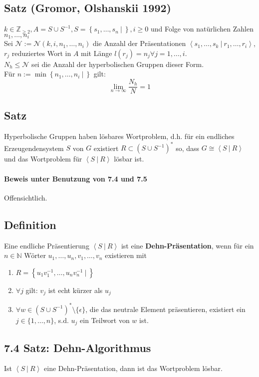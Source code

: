 \documentclass{article}
\newcommand{\df}[1]{\textbf{#1}\index{#1}}
\newcommand{\N}{\mathbb{N}}
\newcommand{\Z}{\mathbb{Z}}
\newcommand{\set}[2]{\left\lbrace #1~|~#2 \right\rbrace}
\newcommand{\grp}[2]{\left\langle #1~|~#2 \right\rangle}
\begin{document}
\subsection{Satz (Gromor, Olshanskii 1992)}
$k \in \Z_{\geq 2}, A = S\cup S^{-1}, S = \set{s_1,\ldots,s_n}{}, i \geq 0$ und Folge von natürlichen Zahlen $n_1,\ldots,n_i$\\
Sei $\mathcal{N} := \mathcal{N}(k,i,n_1,\ldots, n_i)$ die Anzahl der Präsentationen $\grp{s_1,\ldots, s_k}{r_1,\ldots, r_i}$, $r_j$ reduziertes Wort in $A$ mit Länge $l(r_j) = n_j \forall j = 1,\ldots, i$.\\
$N_h \leq \mathcal{N}$ sei die Anzahl der hyperbolischen Gruppen dieser Form.\\
Für $n := \min\set{n_1,\ldots, n_i}{}$ gilt:
\[\lim\limits_{n \rightarrow \infty} \frac{N_h}{N} = 1 \]

\subsection{Satz}
Hyperbolische Gruppen haben lösbares Wortproblem, d.h. für ein endliches Erzeugendensystem $S$ von $G$ existiert $R \subset (S\cup S^{-1})^*$ so, dass $G \cong \grp{S}{R}$ und das Wortproblem für $\grp{S}{R}$ lösbar ist.

\paragraph{Beweis unter Benutzung von 7.4 und 7.5} Offensichtlich.

\subsection{Definition}
Eine endliche Präsentierung $\grp{S}{R}$ ist eine \df{Dehn-Präsentation}, wenn für ein $n \in \N$ Wörter $u_1,\ldots, u_n, v_1,\ldots, v_n$ existieren mit
\begin{enumerate}
	\item $R = \set{u_1v_1^{-1},\ldots, u_nv_n^{-1}}{}$
	\item $\forall j$ gilt: $v_j$ ist echt kürzer als $u_j$
	\item $\forall w \in (S\cup S^{-1})^*\setminus\{\epsilon\}$, die das neutrale Element präsentieren, existiert ein $j \in \{1,\ldots, n\}$, s.d. $u_j$ ein Teilwort von $w$ ist.
\end{enumerate}


\subsection{7.4 Satz: Dehn-Algorithmus}
Ist $\grp{S}{R}$ eine Dehn-Präsentation, dann ist das Wortproblem lösbar.
\end{document}
